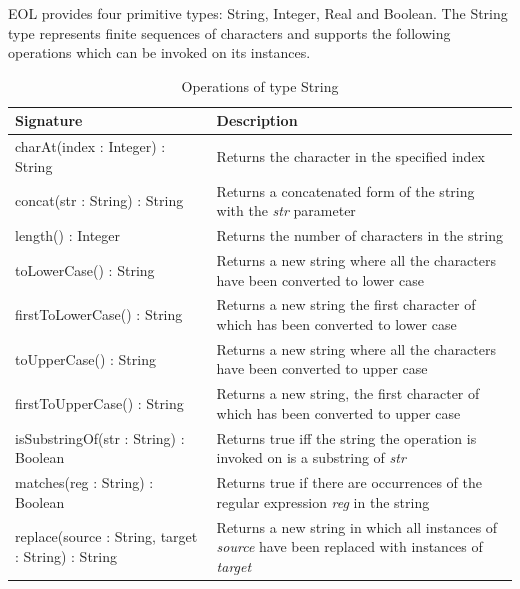 EOL provides four primitive types: String, Integer, Real and Boolean. The String type represents finite sequences of characters and supports the following operations which can be invoked on its instances.

\begin{longtable} {|p{5.5cm}|p{6.5cm}|}
			
			\caption{Operations of type String}
			\label{tab:StringOperations}\\
			
			\hline
							
			\textbf{Signature} & \textbf{Description} \\\hline
			
			charAt(index : Integer) : String & Returns the character in the specified index\\\hline
			
			concat(str : String) : String & Returns a concatenated form of the string with the \emph{str} parameter\\\hline

			length() : Integer & Returns the number of characters in the string \\\hline
						
			toLowerCase() : String & Returns a new string where all the characters have been converted to lower case\\\hline
			
			firstToLowerCase() : String & Returns a new string the first character of which has been converted to lower case \\\hline
			
			toUpperCase() : String & Returns a new string where all the characters have been converted to upper case\\\hline
			
			firstToUpperCase() : String & Returns a new string, the first character of which has been converted to upper case \\\hline
			
			isSubstringOf(str : String) : Boolean & Returns true iff the string the operation is invoked on is a substring of \emph{str} \\\hline
			
			matches(reg : String) : Boolean & Returns true if there are occurrences of the regular expression \emph{reg} in the string\\\hline
			
			replace(source : String, target : String) : String & Returns a new string in which all instances of \emph{source} have been replaced with instances of \emph{target}\\\hline 
			

\end{longtable}
